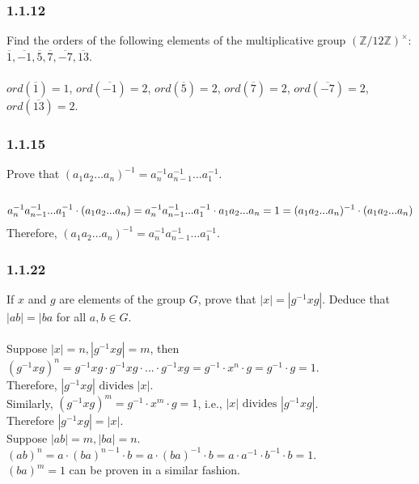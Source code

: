 \documentclass{article}
\begin{document}
\subsubsection{1.1.12}
Find the orders of the following elements of the multiplicative group $(\mathbb{Z}/12\mathbb{Z})^\times$: $\overline{1}, \overline{-1}, \overline{5}, \overline{7}, \overline{-7}, \overline{13}$.\\\\
$ord(\overline{1}) = 1$, $ord(\overline{-1}) = 2$, $ord(\overline{5}) = 2$, $ord(\overline{7}) = 2$, $ord(\overline{-7}) = 2$, $ord(\overline{13}) = 2$.\\

\subsubsection{1.1.15}
Prove that $(a_1 a_2 ... a_n)^{-1} = a_n^{-1} a_{n-1}^{-1} ... a_1^{-1}$.\\\\
\begin{equation*}
    a_n^{-1} a_{n-1}^{-1} ... a_1^{-1} \cdot (a_1 a_2 ... a_n) = a_n^{-1} a_{n-1}^{-1} ... a_1^{-1} \cdot a_1 a_2 ... a_n\\
    = 1 = (a_1 a_2 ... a_n)^{-1} \cdot (a_1 a_2 ... a_n)
\end{equation*}
Therefore, $(a_1 a_2 ... a_n)^{-1} = a_n^{-1} a_{n-1}^{-1} ... a_1^{-1}$.\\

\subsubsection{1.1.22}
If $x$ and $g$ are elements of the group $G$, prove that $|x|=|g^{-1}xg|$. Deduce that $|ab| = |ba$ for all $a,b \in G$.\\\\
Suppose $|x| = n, |g^{-1}xg| =m$, then $(g^{-1}xg)^n = g^{-1}xg \cdot g^{-1}xg \cdot ... \cdot g^{-1}xg = g^{-1} \cdot x^n \cdot g = g^{-1} \cdot g = 1$.\\
Therefore, $|g^{-1}xg| \textrm{ divides } |x| $.\\
Similarly, $(g^{-1}xg) ^ m = g^{-1} \cdot x^m \cdot g = 1$, i.e., $|x| \textrm{ divides } |g^{-1}xg|$.\\
Therefore $|g^{-1}xg| = |x|$.\\
Suppose $|ab| = m, |ba| = n$.\\
$(ab)^n = a \cdot (ba)^{n-1} \cdot b = a \cdot (ba)^{-1} \cdot b = a \cdot a^{-1} \cdot b^{-1} \cdot b = 1$.\\
$(ba)^m = 1$ can be proven in a similar fashion.\\
\end{document}
